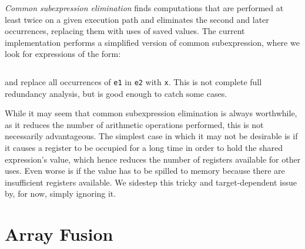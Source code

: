 \emph{Common subexpression elimination} finds computations that are performed at
least twice on a given execution path and eliminates the second and later
occurrences, replacing them with uses of saved values. The current
implementation performs a simplified version of common subexpression, where we
look for expressions of the form:
%
\begin{lstlisting}[style=Haskell,numbers=none]
%\bf$\langle$ common subexpression elimination $\rangle$% let x = e1 in [x/e1]e2
\end{lstlisting}
%
and replace all occurrences of \texttt{e1} in \texttt{e2} with \texttt{x}. This
is not complete full redundancy analysis, but is good enough to catch some
cases.%

While it may seem that common subexpression elimination is always worthwhile, as
it reduces the number of arithmetic operations performed, this is not
necessarily advantageous. The simplest case in which it may not be desirable is
if it causes a register to be occupied for a long time in order to hold the
shared expression's value, which hence reduces the number of registers available
for other uses. Even worse is if the value has to be spilled to memory because
there are insufficient registers available. We sidestep this tricky and
target-dependent issue by, for now, simply ignoring it.




\section{Array Fusion}
\label{sec:fusion}

